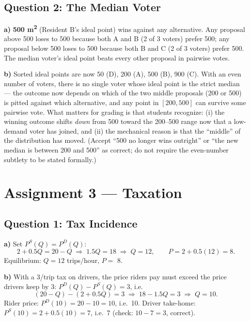 \documentclass[11pt]{article}
\newcommand{\qpart}[1]{\par\vspace{0.3em}\noindent\textbf{#1}\quad}
\begin{document}
\subsection*{Question 2: The Median Voter}

\qpart{a)} \textbf{500 m\textsuperscript{2}} (Resident B's ideal point) wins against any alternative. Any proposal above 500 loses to 500 because both A and B (2 of 3 voters) prefer 500; any proposal below 500 loses to 500 because both B and C (2 of 3 voters) prefer 500. The median voter's ideal point beats every other proposal in pairwise votes.

\qpart{b)} Sorted ideal points are now 50 (D), 200 (A), 500 (B), 900 (C). With an even number of voters, there is no single voter whose ideal point is the strict median --- the outcome now depends on which of the two middle proposals (200 or 500) is pitted against which alternative, and any point in $[200, 500]$ can survive some pairwise vote. What matters for grading is that students recognize: (i) the winning outcome shifts \emph{down} from 500 toward the 200--500 range now that a low-demand voter has joined, and (ii) the mechanical reason is that the ``middle'' of the distribution has moved. (Accept ``500 no longer wins outright'' or ``the new median is between 200 and 500'' as correct; do not require the even-number subtlety to be stated formally.)

\section*{Assignment 3 --- Taxation}

\subsection*{Question 1: Tax Incidence}

\qpart{a)} Set $P^S(Q) = P^D(Q)$:
\[
2 + 0.5Q = 20 - Q \;\Rightarrow\; 1.5Q = 18 \;\Rightarrow\; Q = 12, \qquad P = 2 + 0.5(12) = 8.
\]
Equilibrium: $Q = 12$ trips/hour, $P = $ \texteuro{}8.

\qpart{b)} With a \texteuro{}3/trip tax on drivers, the price riders pay must exceed the price drivers keep by \texteuro{}3: $P^D(Q) - P^S(Q) = 3$, i.e.
\[
(20 - Q) - (2 + 0.5Q) = 3 \;\Rightarrow\; 18 - 1.5Q = 3 \;\Rightarrow\; Q = 10.
\]
Rider price: $P^D(10) = 20 - 10 = 10$, i.e.\ \texteuro{}10. Driver take-home: $P^S(10) = 2 + 0.5(10) = 7$, i.e.\ \texteuro{}7 (check: $10 - 7 = 3$, correct).
\end{document}
